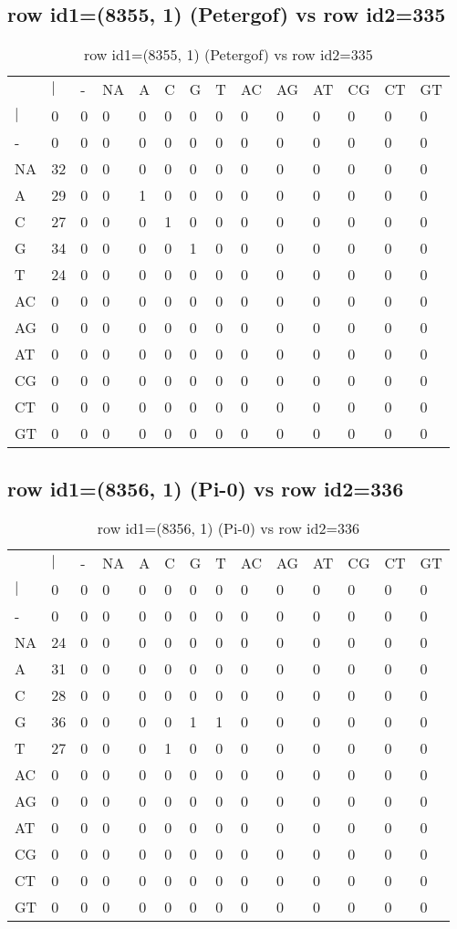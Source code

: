 \subsection{row id1=(8355, 1) (Petergof) vs row id2=335}
\begin{center}
\begin{longtable}{|l|l|l|l|l|l|l|l|l|l|l|l|l|l|}
\caption{row id1=(8355, 1) (Petergof) vs row id2=335} \label{table_dm576}\\
\hline
\\
\hline
&$|$&-&NA&A&C&G&T&AC&AG&AT&CG&CT&GT\\
$|$&0&0&0&0&0&0&0&0&0&0&0&0&0\\
-&0&0&0&0&0&0&0&0&0&0&0&0&0\\
NA&32&0&0&0&0&0&0&0&0&0&0&0&0\\
A&29&0&0&1&0&0&0&0&0&0&0&0&0\\
C&27&0&0&0&1&0&0&0&0&0&0&0&0\\
G&34&0&0&0&0&1&0&0&0&0&0&0&0\\
T&24&0&0&0&0&0&0&0&0&0&0&0&0\\
AC&0&0&0&0&0&0&0&0&0&0&0&0&0\\
AG&0&0&0&0&0&0&0&0&0&0&0&0&0\\
AT&0&0&0&0&0&0&0&0&0&0&0&0&0\\
CG&0&0&0&0&0&0&0&0&0&0&0&0&0\\
CT&0&0&0&0&0&0&0&0&0&0&0&0&0\\
GT&0&0&0&0&0&0&0&0&0&0&0&0&0\\
\hline
\end{longtable}
\end{center}

\subsection{row id1=(8356, 1) (Pi-0) vs row id2=336}
\begin{center}
\begin{longtable}{|l|l|l|l|l|l|l|l|l|l|l|l|l|l|}
\caption{row id1=(8356, 1) (Pi-0) vs row id2=336} \label{table_dm578}\\
\hline
\\
\hline
&$|$&-&NA&A&C&G&T&AC&AG&AT&CG&CT&GT\\
$|$&0&0&0&0&0&0&0&0&0&0&0&0&0\\
-&0&0&0&0&0&0&0&0&0&0&0&0&0\\
NA&24&0&0&0&0&0&0&0&0&0&0&0&0\\
A&31&0&0&0&0&0&0&0&0&0&0&0&0\\
C&28&0&0&0&0&0&0&0&0&0&0&0&0\\
G&36&0&0&0&0&1&1&0&0&0&0&0&0\\
T&27&0&0&0&1&0&0&0&0&0&0&0&0\\
AC&0&0&0&0&0&0&0&0&0&0&0&0&0\\
AG&0&0&0&0&0&0&0&0&0&0&0&0&0\\
AT&0&0&0&0&0&0&0&0&0&0&0&0&0\\
CG&0&0&0&0&0&0&0&0&0&0&0&0&0\\
CT&0&0&0&0&0&0&0&0&0&0&0&0&0\\
GT&0&0&0&0&0&0&0&0&0&0&0&0&0\\
\hline
\end{longtable}
\end{center}

